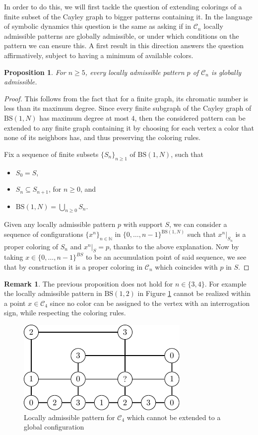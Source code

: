 \documentclass[letterpaper,11pt,reqno]{amsart}
\theoremstyle{plain}
\newtheorem{proposition}[theorem]{Proposition}
\theoremstyle{definition}
\newtheorem{remark}{Remark}
\newcommand{\BS}[1][N]{\mathrm{BS}(1,#1)}
\begin{document}
In order to do this, we will first tackle the question of extending colorings of a finite subset of the Cayley graph to bigger patterns containing it. In the language of symbolic dynamics this question is the same as asking if in $\mathcal{C}_n$ locally admissible patterns are globally admissible, or under which conditions on the pattern we can ensure this. A first result in this direction answers the question affirmatively, subject to having a minimum of available colors.
\begin{proposition} \label{prop:loc_adm_5_colors}
	For $n\ge 5$, every locally admissible pattern $p$ of $\mathcal{C}_n$ is globally admissible.
\end{proposition}
\begin{proof}
	This follows from the fact that for a finite graph, its chromatic number is less than its maximum degree. Since every finite subgraph of the Cayley graph of $\BS$ has maximum degree at most $4$, then the considered pattern can be extended to any finite graph containing it by choosing for each vertex a color that none of its neighbors has, and thus preserving the coloring rules. 
	
	Fix a sequence of finite subsets $\{S_n\}_{n\ge 1}$ of $\BS$, such that
	\begin{itemize}
		\item $S_0=S$,
		\item $S_n\subseteq S_{n+1}$, for $n\ge 0$, and
		\item $\BS=\bigcup_{n\ge 0}S_n$.
	\end{itemize}
	
	Given any locally admissible pattern $p$ with support $S$, we can consider a sequence of configurations $\{x^{n}\}_{n\in \mathbb{N}}$ in $\{0,\ldots,n-1\}^{\BS}$ such that $x^{n}|_{S_n}$ is a proper coloring of $S_n$ and $x^{n}|_{S}=p$, thanks to the above explanation. Now by taking $x\in \{0,\ldots,n-1\}^{BS}$ to be an accumulation point of said sequence, we see that by construction it is a proper coloring in $\mathcal{C}_n$ which coincides with $p$ in $S$.
\end{proof}
\begin{remark} The previous proposition does not hold for $n\in \{3,4\}$. For example the locally admissible pattern in $\BS[2]$ in Figure \ref{fig:no_extend_gap} cannot be realized within a point $x \in \mathcal{C}_4$ since no color can be assigned to the vertex with an interrogation sign, while respecting the coloring rules.
	\begin{figure}
		\centering
		\includegraphics{non_globallyadmissible.pdf}
		\caption{Locally admissible pattern for $\mathcal{C}_4$ which cannot be extended to a global configuration}
		\label{fig:no_extend_gap}
	\end{figure}	
\end{remark}
\end{document}
